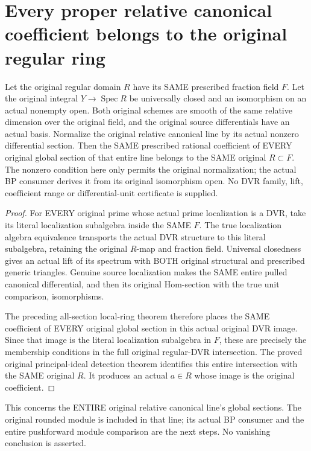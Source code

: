 \section{Every proper relative canonical coefficient belongs to the original regular ring}
\label{sec:proper-canonical-coefficient-regularity}

\begin{theorem}
\label{sc0-proper-canonical-regularity:all-original-sections}
\leanok
Let the original regular domain $R$ have its SAME prescribed fraction
field $F$. Let the original integral $Y\to\operatorname{Spec}R$
be universally closed and an isomorphism on an actual nonempty open.
Both original schemes are smooth of the same relative dimension
over the original field, and the original source differentials
have an actual basis. Normalize the original relative canonical
line by its actual nonzero differential section. Then the SAME
prescribed rational coefficient of EVERY original global section
of that entire line belongs to the SAME original $R\subset F$.
The nonzero condition here only permits the original normalization;
the actual BP consumer derives it from its original isomorphism open.
No DVR family, lift, coefficient range or differential-unit
certificate is supplied.
\end{theorem}
\begin{proof}
For EVERY original prime whose actual prime localization is a DVR,
take its literal localization subalgebra inside the SAME $F$.
The true localization algebra equivalence transports the actual
DVR structure to this literal subalgebra, retaining the original
$R$-map and fraction field. Universal closedness gives an actual
lift of its spectrum with BOTH original structural and prescribed
generic triangles. Genuine source localization makes the SAME
entire pulled canonical differential, and then its original
Hom-section with the true unit comparison, isomorphisms.

The preceding all-section local-ring theorem therefore places
the SAME coefficient of EVERY original global section in this
actual original DVR image. Since that image is the literal
localization subalgebra in $F$, these are precisely the membership
conditions in the full original regular-DVR intersection.
The proved original principal-ideal detection theorem identifies
this entire intersection with the SAME original $R$. It produces
an actual $a\in R$ whose image is the original coefficient.
\end{proof}

This concerns the ENTIRE original relative canonical line's global
sections. The original rounded module is included in that line;
its actual BP consumer and the entire pushforward module comparison
are the next steps. No vanishing conclusion is asserted.
